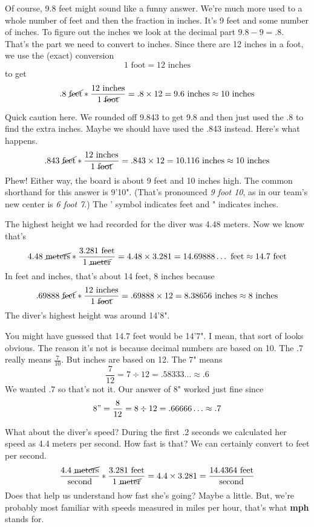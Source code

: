 Of course, 9.8 feet might sound like a funny answer.  We're much more used to a whole number of feet and then the fraction in inches.  It's 9 feet and some number of inches.  To figure out the inches we look at the decimal part $9.8-9=.8$.  That's the part we need to convert to inches.    Since there are 12 inches in a foot, we use the (exact) conversion
$$1 \text{ foot} = 12 \text{ inches}$$
to get
$$.8 \text{ \cancel{feet}} \ast \frac{12 \text{ inches}}{1 \text{ \cancel{foot}}} = .8 \times 12 = 9.6 \text{ inches} \approx 10 \text{ inches}$$  

Quick caution here.  We rounded off 9.843 to get 9.8 and then just used the .8 to find the extra inches.  Maybe we should have used the .843 instead.  Here's what happens.
$$.843 \text{ \cancel{feet}} \ast \frac{12 \text{ inches}}{1 \text{ \cancel{foot}}} = .843 \times 12 = 10.116 \text{ inches} \approx 10 \text{ inches}$$  Phew!  Either way, the board is about 9 feet and 10 inches high.  The common shorthand for this answer is 9'10".  (That's pronounced \emph{9 foot 10}, as in our team's new center is \emph{6 foot 7}.)  The ' symbol indicates feet and " indicates inches.


The highest height we had recorded for the diver was 4.48 meters.  Now we know that's 
$$ 4.48 \text{ \cancel{meters}}  \ast \frac{3.281 \text{ feet}}{1 \text{ \cancel{meter}}} 
=4.48 \times 3.281= 14.69888\ldots \text{ feet} \approx 14.7 \text{ feet}$$  
In feet and inches, that's about 14 feet, 8 inches because 
$$.69888 \text{ \cancel{feet}} \ast \frac{12 \text{ inches}}{1 \text{ \cancel{foot}}} = .69888 \times 12 = 8.38656 \text{ inches} \approx 8 \text{ inches}$$ 
The diver's highest height was around 14'8".  

You might have guessed that 14.7 feet would be 14'7".  I mean, that sort of looks obvious.  The reason it's not is because decimal numbers are based on 10.  The .7 really means $\frac{7}{10}$.  But inches are based on 12.  The 7" means 
$$\frac{7}{12}=7 \div 12 = .58333\ldots \approx .6$$
We wanted .7 so that's not it.  Our answer of 8" worked just fine since 
$$8" = \frac{8}{12} = 8 \div 12 = .66666\ldots \approx .7$$

What about the diver's speed?   During the first .2 seconds we calculated her speed as 4.4 meters per second.  How fast is that?  We can certainly convert to feet per second.  
$$\frac{4.4 \text{ \cancel{meters}}}{\text{second}} \ast \frac{3.281 \text{ feet}}{1 \text{  \cancel{meter}}} = 4.4 \times 3.281 = \frac{14.4364 \text{ feet}}{\text{second}}$$ 
Does that help us understand how fast she's going?  Maybe a little.  But, we're probably most familiar with speeds measured in miles per hour, that's what \textbf{mph} stands for.

